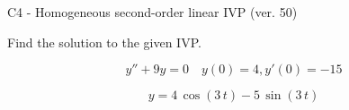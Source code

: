 \begin{exercise}
  \begin{exerciseTitle}C4 - Homogeneous second-order linear IVP (ver. 50)\end{exerciseTitle}
  \begin{exerciseStatement}
    
Find the solution to the given IVP.

    
\[y''+9y = 0 \hspace{1em} y(0) = 4 , y'(0) = -15\]

  \end{exerciseStatement}
  \begin{exerciseAnswer}
    
\[y= 4 \, \cos\left(3 \, t\right) - 5 \, \sin\left(3 \, t\right)\]

  \end{exerciseAnswer}
\end{exercise}